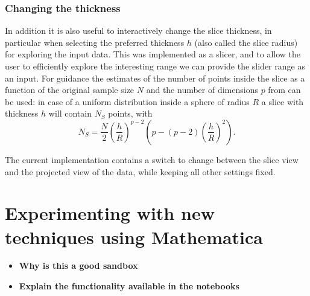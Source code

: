 \documentclass[]{interact}
\theoremstyle{plain}%
\theoremstyle{definition}
\theoremstyle{remark}
\providecommand{\tightlist}{%
  \setlength{\itemsep}{0pt}\setlength{\parskip}{0pt}}
\def\tightlist{}
\begin{document}
\hypertarget{changing-the-thickness}{%
\subsubsection{Changing the thickness}\label{changing-the-thickness}}

In addition it is also useful to interactively change the slice
thickness, in particular when selecting the preferred thickness \(h\)
(also called the slice radius) for exploring the input data. This was
implemented as a slicer, and to allow the user to efficiently explore
the interesting range we can provide the slider range as an input. For
guidance the estimates of the number of points inside the slice as a
function of the original sample size \(N\) and the number of dimensions
\(p\) from \citet{sectionpursuit} can be used: in case of a uniform
distribution inside a sphere of radius \(R\) a slice with thickness
\(h\) will contain \(N_S\) points, with \begin{equation}
N_S = \frac{N}{2} \left(\frac{h}{R}\right)^{p-2} \left(p - (p-2)\left(\frac{h}{R}\right)^{2}\right).
\label{eq:count}
\end{equation}

The current implementation contains a switch to change between the slice
view and the projected view of the data, while keeping all other
settings fixed.

\hypertarget{sec:implementation}{%
\section{Experimenting with new techniques using
Mathematica}\label{sec:implementation}}

\begin{itemize}
\tightlist
\item
  \textbf{Why is this a good sandbox}
\item
  \textbf{Explain the functionality available in the notebooks}
\end{itemize}
\end{document}
